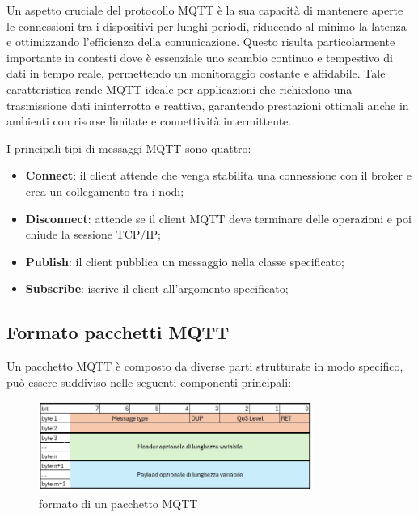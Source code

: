 \documentclass[12pt,a4paper,openright,twoside]{book}
\begin{document}
Un aspetto cruciale del protocollo MQTT è la sua capacità di mantenere aperte le connessioni tra i dispositivi per lunghi periodi, riducendo al minimo la latenza 
e ottimizzando l'efficienza della comunicazione. Questo risulta particolarmente importante in contesti dove è essenziale uno scambio continuo e tempestivo di dati 
in tempo reale, permettendo un monitoraggio costante e affidabile. Tale caratteristica rende MQTT ideale per applicazioni che richiedono una trasmissione dati 
ininterrotta e reattiva, garantendo prestazioni ottimali anche in ambienti con risorse limitate e connettività intermittente.

I principali tipi di messaggi MQTT sono quattro:
\begin{itemize}
    \item \textbf{Connect}: il client attende che venga stabilita una connessione con il broker e crea un collegamento tra i nodi;
    \item \textbf{Disconnect}: attende se il client MQTT deve terminare delle operazioni e poi chiude la sessione TCP/IP;
    \item \textbf{Publish}: il client pubblica un messaggio nella classe specificato;
    \item \textbf{Subscribe}: iscrive il client all’argomento specificato;
\end{itemize}

\subsection{Formato pacchetti MQTT}
Un pacchetto \ac{MQTT} è composto da diverse parti strutturate in modo specifico, può essere suddiviso nelle seguenti componenti principali:

\begin{figure}[H]
    \centering
    \includegraphics[width=0.8\textwidth]{figures/mqtt-packet.png}
    \caption{formato di un pacchetto MQTT}
    \label{fig:mqtt-packet}
\end{figure}
\end{document}
